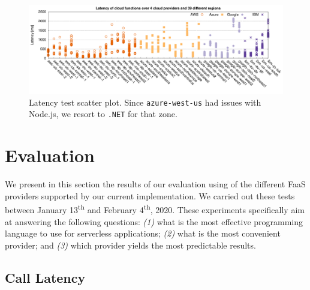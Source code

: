 
\begin{figure}[!t]
\centering
\includegraphics[width=1.0\textwidth]{bilder/latency/latency}
\caption{Latency test scatter plot. Since \texttt{azure-west-us} had issues with Node.js, we resort to \texttt{.NET} for that zone.}
\label{fig:latency_plot}
\end{figure}

\section{Evaluation}
\label{sec:evaluation}

We present in this section the results of our evaluation using \sys of the different FaaS providers supported by our current implementation.
We carried out these tests between January 13\textsuperscript{th} and February 4\textsuperscript{th}, 2020.
These experiments specifically aim at answering the following questions: 
\emph{(1)} what is the most effective programming language to use for serverless applications;
\emph{(2)} what is the most convenient provider; and
\emph{(3)} which provider yields the most predictable results.

%

\subsection{Call Latency}

